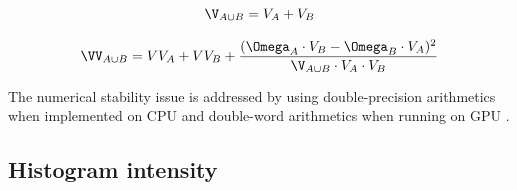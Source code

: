 \documentclass[preprint]{iucr}              %
\begin{document}
\begin{equation}
\V_{A \cup B} =  V_{A} + V_{B} 
\end{equation}
  
\begin{equation}
\VV_{A \cup B} =  VV_{A} + VV_{B} +  \frac{(\Omega_{A} \cdot V_{B} - \Omega_{B}\cdot V_{A})^2}{\V_{A \cup B} \cdot  V_{A} \cdot V_{B}}
\end{equation}
  
The numerical stability issue is addressed by using double-precision arithmetics when implemented on CPU and double-word arithmetics when running on GPU \cite{double_word}.

\subsection{Histogram intensity }
\end{document}
